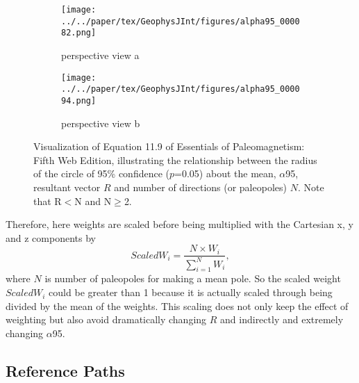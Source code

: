 \begin{figure*}
  \centering
  \begin{subfigure}{.49\textwidth}
    \texttt{[image: ../../paper/tex/GeophysJInt/figures/alpha95\_000082.png]}
    \caption{perspective view a}
  \end{subfigure}
  \begin{subfigure}{.49\textwidth}
    \texttt{[image: ../../paper/tex/GeophysJInt/figures/alpha95\_000094.png]}
    \caption{perspective view b}
  \end{subfigure}
  \caption[Visualization of equation that relates $\alpha$95, and R and
N]{Visualization of Equation 11.9 of Essentials of Paleomagnetism: Fifth Web
Edition, illustrating the relationship between the radius of the circle of 95\%
confidence ($p$=0.05) about the mean, $\alpha$95, resultant vector $R$ and
number of directions (or paleopoles) $N$. Note that R$<$N and
N$\geq$2.}\label{fig-alpha95}
\end{figure*}

Therefore, here weights are scaled before being multiplied with the Cartesian x,
y and z components by
%
\begin{equation*}
  ScaledW_i=\frac{N \times W_i}{\sum\limits_{i=1}^{N} W_i},
\end{equation*}
%
where $N$ is number of paleopoles for making a mean pole. So the scaled weight
$ScaledW_i$ could be greater than 1 because it is actually scaled through being
divided by the mean of the weights. This scaling does not only keep the effect
of weighting but also avoid dramatically changing $R$ and indirectly and
extremely changing $\alpha$95.

\subsection{Reference Paths}\label{sec:refpath}

